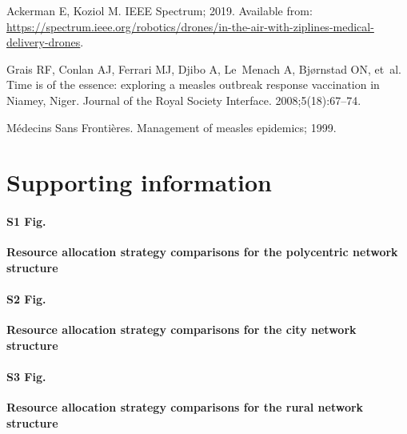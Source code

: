 \documentclass[10pt,letterpaper]{article}
\begin{document}
\begin{thebibliography}{10}
Ackerman E, Koziol M.
\newblock IEEE Spectrum; 2019.
\newblock Available from:
  \url{https://spectrum.ieee.org/robotics/drones/in-the-air-with-ziplines-medical-delivery-drones}.

Grais RF, Conlan AJ, Ferrari MJ, Djibo A, Le~Menach A, Bj{\o}rnstad ON, et~al.
\newblock Time is of the essence: exploring a measles outbreak response
  vaccination in Niamey, Niger.
\newblock Journal of the Royal Society Interface. 2008;5(18):67--74.

{\uppercase{M}\'edecins \uppercase{S}ans \uppercase{F}ronti\`eres}. Management
  of measles epidemics; 1999.

\end{thebibliography}


\section*{Supporting information}
\paragraph*{S1 Fig.}
\label{SI:S1_fig}
{\bf Resource allocation strategy comparisons for the polycentric network structure}
\begin{figure}[ht!]
\end{figure}

\paragraph*{S2 Fig.}
\label{SI:S2_fig}
{\bf Resource allocation strategy comparisons for the city network structure}
\begin{figure}[ht!]
\end{figure}

\paragraph*{S3 Fig.}
\label{SI:S3_fig}
{\bf Resource allocation strategy comparisons for the rural network structure}
\begin{figure}[ht!]
\end{figure}
\end{document}
